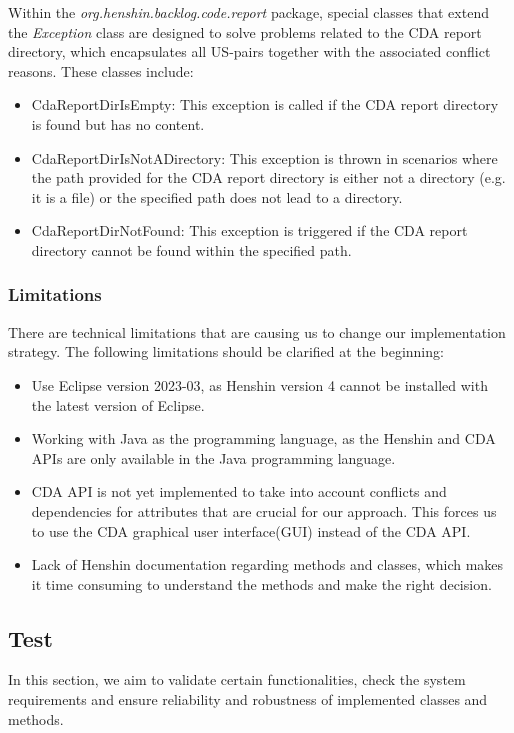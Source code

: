 Within the \textit{org.henshin.backlog.code.report} package, special classes that extend the \textit{Exception} class are designed to solve problems related to the CDA report directory, which encapsulates all US-pairs together with the associated conflict reasons. These classes include:
\begin{itemize}
	\item CdaReportDirIsEmpty: This exception is called if the CDA report directory is found but has no content.
	\item CdaReportDirIsNotADirectory: This exception is thrown in scenarios where the path provided for the CDA report directory is either not a directory (e.g. it is a file) or the specified path does not lead to a directory.
	\item CdaReportDirNotFound: This exception is triggered if the CDA report directory cannot be found within the specified path.
\end{itemize}
\subsubsection*{Limitations}
There are technical limitations that are causing us to change our implementation strategy.
The following limitations should be clarified at the beginning:
\begin{itemize}
	\item Use Eclipse version 2023-03, as Henshin version 4 cannot be installed with the latest version of Eclipse.
	
	\item Working with Java as the programming language, as the Henshin and CDA APIs are only available in the Java programming language.
	
	\item CDA API is not yet implemented to take into account conflicts and dependencies for attributes that are crucial for our approach. This forces us to use the CDA graphical user interface(GUI) instead of the CDA API.
	
	\item Lack of Henshin documentation regarding methods and classes, which makes it time consuming to understand the methods and make the right decision.
\end{itemize}
\subsection{Test}\label{redundancy_test}
In this section, we aim to validate certain functionalities, check the system requirements and ensure reliability and robustness of implemented classes and methods. 

